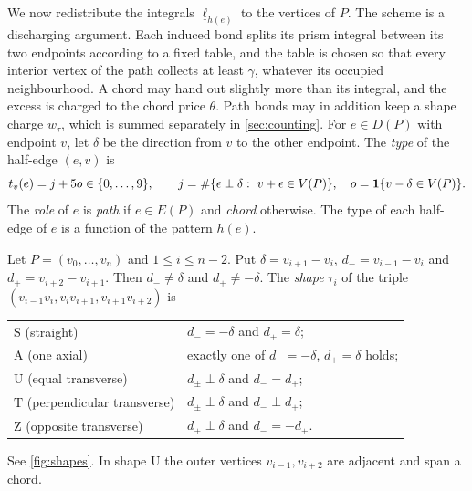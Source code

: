 We now redistribute the integrals $\underline\ell_{h(e)}$ to the vertices of $P$. The scheme is a discharging argument. Each induced bond splits its prism integral between its two endpoints according to a fixed table, and the table is chosen so that every interior vertex of the path collects at least $\gamma$, whatever its occupied neighbourhood. A chord may hand out slightly more than its integral, and the excess is charged to the chord price $\theta$. Path bonds may in addition keep a shape charge $w_\tau$, which is summed separately in \cref{sec:counting}. For $e\in D(P)$ with endpoint $v$, let $\delta$ be the direction from $v$ to the other endpoint. The \emph{type} of the half-edge $(e,v)$ is
\begin{equation}\label{eq:type}
 t_v(e)=j+5o\in\{0,\dots,9\},\qquad j=\#\{\epsilon\perp\delta:\ v+\epsilon\in V(P)\},\quad o=\one\{v-\delta\in V(P)\}.
\end{equation}
The \emph{role} of $e$ is \emph{path} if $e\in E(P)$ and \emph{chord} otherwise. The type of each half-edge of $e$ is a function of the pattern $h(e)$.

\begin{definition}[Shapes]\label{def:shape}
Let $P=(v_0,\dots,v_n)$ and $1\le i\le n-2$. Put $\delta=v_{i+1}-v_i$, $d_-=v_{i-1}-v_i$ and $d_+=v_{i+2}-v_{i+1}$. Then $d_-\ne\delta$ and $d_+\ne-\delta$. The \emph{shape} $\tau_i$ of the triple $(v_{i-1}v_i,v_iv_{i+1},v_{i+1}v_{i+2})$ is
\begin{center}
\begin{tabular}{ll}
 $\mathrm S$ (straight) & $d_-=-\delta$ and $d_+=\delta$;\\
 $\mathrm A$ (one axial) & exactly one of $d_-=-\delta$, $d_+=\delta$ holds;\\
 $\mathrm U$ (equal transverse) & $d_\pm\perp\delta$ and $d_-=d_+$;\\
 $\mathrm T$ (perpendicular transverse) & $d_\pm\perp\delta$ and $d_-\perp d_+$;\\
 $\mathrm Z$ (opposite transverse) & $d_\pm\perp\delta$ and $d_-=-d_+$.
\end{tabular}
\end{center}
See \cref{fig:shapes}. In shape $\mathrm U$ the outer vertices $v_{i-1},v_{i+2}$ are adjacent and span a chord.
\end{definition}




